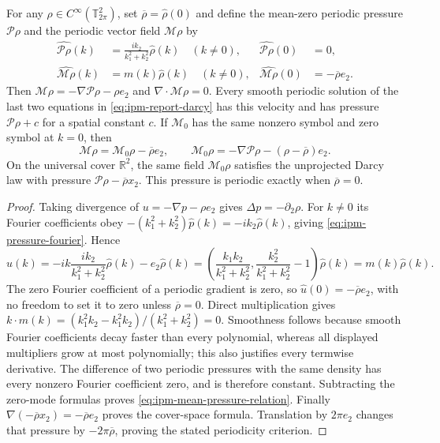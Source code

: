 \begin{proposition}
\label{prop:ipm-pressure}
For any $\rho\in C^\infty(\mathbb T^2_{2\pi})$, set
$\overline\rho=\widehat\rho(0)$ and define the mean-zero periodic pressure
$\mathcal P\rho$ and the periodic vector field $\mathcal M\rho$ by
\begin{align}
 \widehat{\mathcal P\rho}(k)&=
       \frac{i k_2}{k_1^2+k_2^2}\widehat\rho(k)\quad(k\ne0),
 &\widehat{\mathcal P\rho}(0)&=0,\label{eq:ipm-pressure-fourier}\\
 \widehat{\mathcal M\rho}(k)&=m(k)\widehat\rho(k)\quad(k\ne0),
 &\widehat{\mathcal M\rho}(0)&=-\overline\rho e_2.
 \label{eq:ipm-full-operator}
\end{align}
Then $\mathcal M\rho=-\nabla\mathcal P\rho-\rho e_2$ and
$\nabla\cdot\mathcal M\rho=0$. Every smooth periodic solution of the
last two equations in \eqref{eq:ipm-report-darcy} has this velocity and
has pressure $\mathcal P\rho+c$ for a spatial constant $c$.
If $\mathcal M_0$ has the same nonzero symbol and zero symbol at $k=0$, then
\begin{equation}\label{eq:ipm-mean-pressure-relation}
 \mathcal M\rho=\mathcal M_0\rho-\overline\rho e_2,
 \qquad
 \mathcal M_0\rho=-\nabla\mathcal P\rho-(\rho-\overline\rho)e_2.
\end{equation}
On the universal cover $\mathbb R^2$, the same field $\mathcal M_0\rho$
satisfies the unprojected Darcy law with pressure
$\mathcal P\rho-\overline\rho x_2$. This pressure is periodic exactly when
$\overline\rho=0$.
\end{proposition}
\begin{proof}
Taking divergence of $u=-\nabla p-\rho e_2$ gives
$\Delta p=-\partial_2\rho$. For $k\ne0$ its Fourier coefficients obey
$-(k_1^2+k_2^2)\widehat p(k)=-i k_2\widehat\rho(k)$, giving
\eqref{eq:ipm-pressure-fourier}. Hence
\[
 \widehat u(k)=-ik\frac{ik_2}{k_1^2+k_2^2}\widehat\rho(k)
                   -e_2\widehat\rho(k)
 =\left(\frac{k_1k_2}{k_1^2+k_2^2},
 \frac{k_2^2}{k_1^2+k_2^2}-1\right)\widehat\rho(k)
 =m(k)\widehat\rho(k).
\]
The zero Fourier coefficient of a periodic gradient is zero, so
$\widehat u(0)=-\overline\rho e_2$, with no freedom to set it to zero
unless $\overline\rho=0$. Direct multiplication gives
$k\cdot m(k)=(k_1^2k_2-k_1^2k_2)/(k_1^2+k_2^2)=0$.
Smoothness follows because smooth Fourier coefficients decay faster than
every polynomial, whereas all displayed multipliers grow at most
polynomially; this also justifies every termwise derivative. The difference
of two periodic pressures with the same density has every nonzero Fourier
coefficient zero, and is therefore constant. Subtracting the zero-mode
formulas proves \eqref{eq:ipm-mean-pressure-relation}.
Finally $\nabla(-\overline\rho x_2)=-\overline\rho e_2$ proves the
cover-space formula. Translation by $2\pi e_2$ changes that pressure by
$-2\pi\overline\rho$, proving the stated periodicity criterion.
\end{proof}

